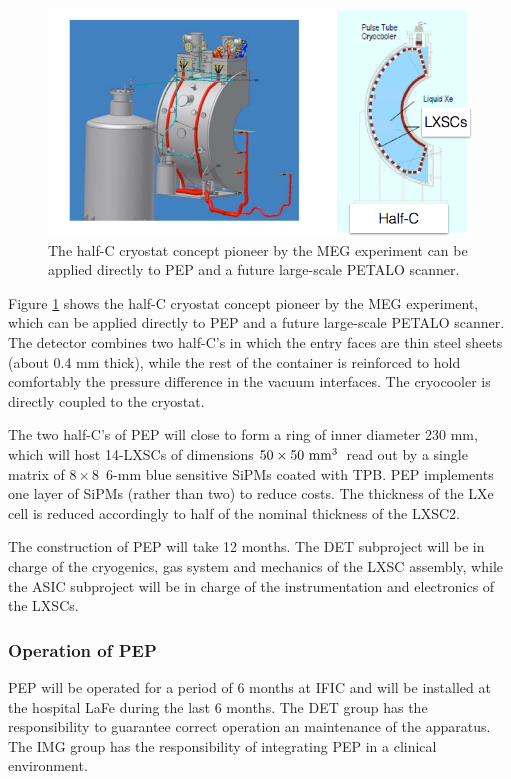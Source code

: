 \begin{figure}[!htb]
	\centering
	\includegraphics[scale=0.45]{img/HalfC.png}
	\caption{\label{fig.halfC} The half-C cryostat concept pioneer by the MEG experiment can be applied directly
	to PEP and a future large-scale PETALO scanner. }
\end{figure}

Figure \ref{fig.halfC} shows the half-C cryostat concept pioneer by the MEG experiment, which can be applied directly to PEP and a future large-scale PETALO scanner. The detector combines two half-C's in which the entry
faces are thin steel sheets (about 0.4 mm thick), while the rest of the container is reinforced to hold comfortably
	the pressure difference in the vacuum interfaces.  The cryocooler is directly coupled to the cryostat.    

The two half-C's of PEP will close to form a ring of inner diameter 230 mm, which will host 14-LXSCs
of dimensions  $50 \times 50 \time 25\mathrm{~mm^3}$~read out by a single matrix of $8 \times 8$~6-mm blue sensitive SiPMs coated with TPB. PEP implements one layer of SiPMs (rather than two) to reduce costs. The thickness of the LXe cell is reduced accordingly to half of the nominal thickness of the LXSC2. 

The construction of PEP will take 12 months. The DET subproject will be in charge of the cryogenics, gas system and mechanics of the LXSC assembly, while the ASIC subproject will be in charge of the instrumentation and electronics of the LXSCs. 



\subsubsection*{Operation of PEP}
PEP will be operated for a period of 6 months at IFIC and will be installed at the hospital LaFe during the last 6 months. The DET group has the responsibility to guarantee correct operation an maintenance of the apparatus. The IMG group has the responsibility of integrating PEP in a clinical environment. 

